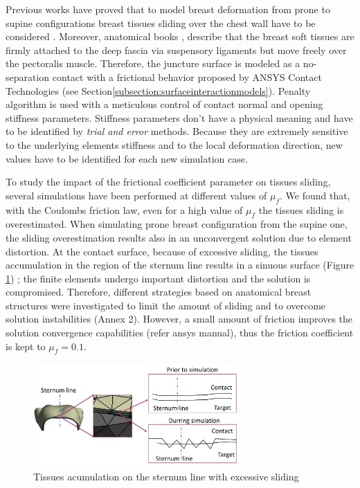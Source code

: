 Previous works have proved that to model breast deformation from prone to supine configurations breast tissues sliding over the chest wall have to be considered \citep{carter_application_2012,han_nonlinear_2014}. Moreover, anatomical books \citep{mugea2014aesthetic,clemente2011anatomy},  describe that the breast soft tissues are firmly attached to the deep fascia via suspensory ligaments but move freely over the pectoralis muscle.  Therefore, the juncture surface is modeled as a no-separation contact with a frictional behavior proposed by ANSYS Contact Technologies (see Section\ref{subsection:surfaceinteractionmodels}). Penalty algorithm is used with a meticulous control of contact normal and opening stiffness parameters. Stiffness parameters don't have a physical meaning and have to be identified by \textit{trial and error} methods. Because they are extremely sensitive to the underlying elements stiffness and to the local deformation direction, new values have to be identified for each new simulation case.    

To study the impact of the frictional coefficient parameter on tissues sliding, several simulations have been performed at different values of $\mu_f$. We found that, with the Coulombs friction law, even for a high value of $\mu_f$ the tissues sliding is overestimated. When simulating prone breast configuration from the supine one, the sliding overestimation results also in an unconvergent solution due to element distortion. At the contact surface, because of excessive sliding, the tissues accumulation in the region of the sternum line results in a sinuous surface (Figure \ref{fig:overslidingProblem}) ; the finite elements  undergo important distortion and the solution is compromised. Therefore, different strategies based on anatomical breast structures were investigated to limit the amount of sliding and to overcome solution instabilities (Annex 2). However, a small amount of friction improves the solution convergence capabilities (refer ansys manual), thus the friction coefficient is kept to $\mu_f = 0.1$. 
\begin{figure}[!h]
\centering
\includegraphics[width=0.7\textwidth,keepaspectratio]{figures/overslidingProblem.jpg} 
\caption{Tissues acumulation on the sternum line with excessive sliding}\label{fig:overslidingProblem}
\end{figure}
 
